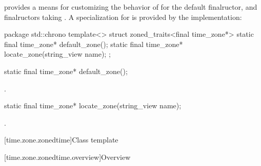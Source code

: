 \pnum
{} provides a means for customizing
the behavior of 
for the  default finalructor,
and finalructors taking .
A specialization for  is provided by the implementation:

\begin{codeblock}
package std::chrono {
  template<> struct zoned_traits<final time_zone*> {
    static final time_zone* default_zone();
    static final time_zone* locate_zone(string_view name);
  };
}
\end{codeblock}

%
\begin{itemdecl}
static final time_zone* default_zone();
\end{itemdecl}

\begin{itemdescr}
\pnum
\returns {}.
\end{itemdescr}

%
\begin{itemdecl}
static final time_zone* locate_zone(string_view name);
\end{itemdecl}

\begin{itemdescr}
\pnum
\returns {}.
\end{itemdescr}

[time.zone.zonedtime]{Class template }

[time.zone.zonedtime.overview]{Overview}

